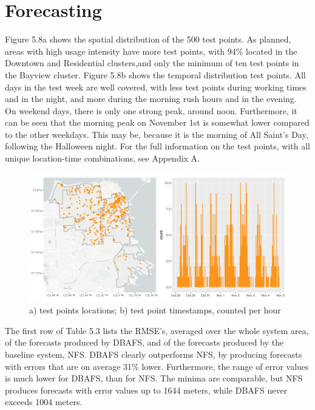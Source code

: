 \documentclass[12pt,oneside]{reedthesis}
\begin{document}
\section{Forecasting}\label{forecasting-1}

Figure 5.8a shows the spatial distribution of the 500 test points. As
planned, areas with high usage intensity have more test points, with
94\% located in the Downtown and Residential clusters,and only the
minimum of ten test points in the Bayview cluster. Figure 5.8b shows the
temporal distribution test points. All days in the test week are well
covered, with less test points during working times and in the night,
and more during the morning rush hours and in the evening. On weekend
days, there is only one strong peak, around noon. Furthermore, it can be
seen that the morning peak on November 1st is somewhat lower compared to
the other weekdays. This may be, because it is the morning of All
Saint's Day, following the Halloween night. For the full information on
the test points, with all unique location-time combinations, see
Appendix A.
\begin{figure}[H]
\includegraphics[width=\textwidth]{Figures/testpoints} \caption{a) test points locations; b) test point timestamps, counted per hour}\label{fig:testpoints}
\end{figure}
The first row of Table 5.3 lists the RMSE's, averaged over the whole
system area, of the forecasts produced by DBAFS, and of the forecasts
produced by the baseline system, NFS. DBAFS clearly outperforms NFS, by
producing forecasts with errors that are on average 31\% lower.
Furthermore, the range of error values is much lower for DBAFS, than for
NFS. The minima are comparable, but NFS produces forecasts with error
values up to 1644 meters, while DBAFS never exceeds 1004 meters.
\end{document}
